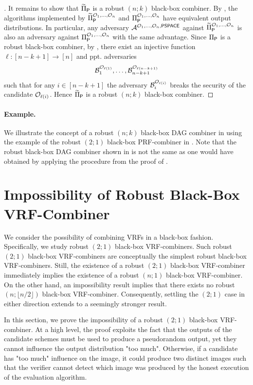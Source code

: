 \begin{proof}[]
	It remains to show that $\DAGComb{P}$ is a robust $(n;k)$ black-box combiner.
	By , the algorithms implemented by $\DAGComb{P}[\O_1, \ldots, \O_n]$
	and $\BBComb{P}[\O_1, \ldots, \O_n]$ have equivalent output distributions. In particular, any adversary $\mathcal{A}^{\mathcal{O}_1, \ldots, \mathcal{O}_n, \textup{\textsf{PSPACE}}}$
	against $\DAGComb{P}[\O_1, \ldots, \O_n]$ is also an adversary against $\BBComb{P}[\O_1, \ldots, \O_n]$
	with the same advantage. 
	Since $\BBComb{P}$ is a robust black-box combiner, by ,
	there exist an injective function $\ell: [n-k+1] \to [n]$ and ppt. adversaries
	\[
		\mathcal{B}_1^{\mathcal{O}_{\ell(1)}}, \ldots, \mathcal{B}_{n-k+1}^{\mathcal{O}_{\ell(n-k+1)}}
	\]
	such that for any $i \in [n-k+1]$ the adversary $\mathcal{B}_i^{\mathcal{O}_{\ell(i)}}$ breaks the security of 
	the candidate $\mathcal{O}_{\ell(i)}$. Hence $\DAGComb{P}$ is a robust $(n;k)$ black-box combiner.
\end{proof}

\paragraph{Example.}
We illustrate the concept of a robust $(n;k)$ black-box DAG combiner in 
using the example of the robust $(2;1)$ black-box PRF-combiner in . 
Note that the robust black-box DAG combiner shown in 
is not the same as one would have obtained by applying the procedure from the proof of .

\newpage

\section{Impossibility of Robust Black-Box VRF-Combiner}

We consider the possibility of combining VRFs in a black-box fashion.
Specifically, we study robust $(2;1)$ black-box VRF-combiners. 
Such robust $(2;1)$ black-box VRF-combiners are conceptually the simplest robust black-box VRF-combiners.
Still, the existence of a robust $(2;1)$ black-box VRF-combiner immediately implies the 
existence of a robust $(n;1)$ black-box VRF-combiner. On the other hand, an impossibility result implies
that there exists no robust $(n;\lfloor n/2\rfloor)$ black-box VRF-combiner.
Consequently, settling the $(2;1)$ case in either direction extends to a seemingly stronger result.

In this section, we prove the impossibility of a robust $(2;1)$ black-box VRF-combiner.
At a high level, the proof exploits the fact that the outputs of the candidate schemes must be used to produce a pseudorandom output,
yet they cannot influence the output distribution "too much". Otherwise, if a candidate has "too much" influence on the image, it could produce
two distinct images such that the verifier cannot detect which image was produced by the honest execution of the evaluation algorithm.

